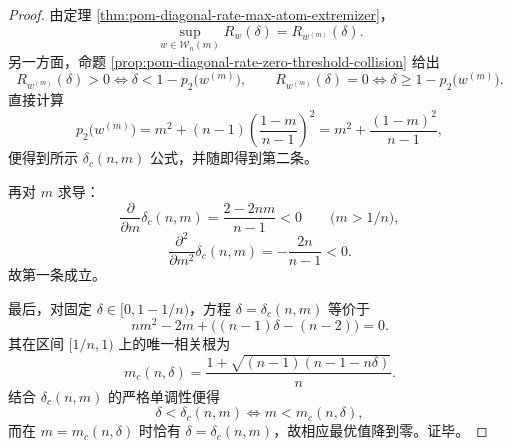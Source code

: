 \begin{proof}
由定理 \ref{thm:pom-diagonal-rate-max-atom-extremizer}，
\[
\sup_{w\in\mathcal W_n(m)}R_w(\delta)=R_{w^{(m)}}(\delta).
\]
另一方面，命题 \ref{prop:pom-diagonal-rate-zero-threshold-collision} 给出
\[
R_{w^{(m)}}(\delta)>0
\iff
\delta<1-p_2\!\bigl(w^{(m)}\bigr),
\qquad
R_{w^{(m)}}(\delta)=0
\iff
\delta\ge 1-p_2\!\bigl(w^{(m)}\bigr).
\]
直接计算
\[
p_2\!\bigl(w^{(m)}\bigr)
=
m^2+(n-1)\left(\frac{1-m}{n-1}\right)^2
=
m^2+\frac{(1-m)^2}{n-1},
\]
便得到所示 \(\delta_c(n,m)\) 公式，并随即得到第二条。

再对 \(m\) 求导：
\[
\frac{\partial}{\partial m}\delta_c(n,m)=\frac{2-2nm}{n-1}<0
\qquad
\bigl(m>1/n\bigr),
\]
\[
\frac{\partial^2}{\partial m^2}\delta_c(n,m)=-\frac{2n}{n-1}<0.
\]
故第一条成立。

最后，对固定 \(\delta\in[0,1-1/n)\)，方程 \(\delta=\delta_c(n,m)\) 等价于
\[
nm^2-2m+\bigl((n-1)\delta-(n-2)\bigr)=0.
\]
其在区间 \([1/n,1)\) 上的唯一相关根为
\[
m_c(n,\delta)=\frac{1+\sqrt{(n-1)(n-1-n\delta)}}{n}.
\]
结合 \(\delta_c(n,m)\) 的严格单调性便得
\[
\delta<\delta_c(n,m)\iff m<m_c(n,\delta),
\]
而在 \(m=m_c(n,\delta)\) 时恰有 \(\delta=\delta_c(n,m)\)，故相应最优值降到零。证毕。
\end{proof}

